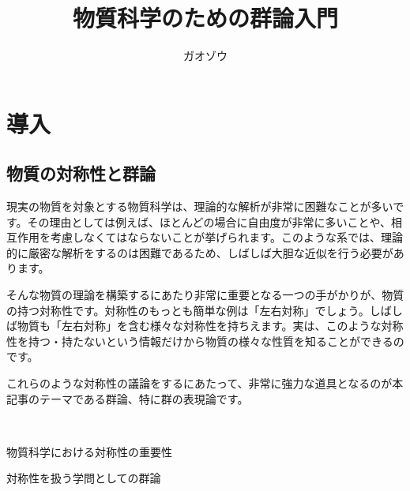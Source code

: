 \documentclass[uplatex,dvipdfmx]{jsarticle}
\title{物質科学のための群論入門}
\author{ガオゾウ}
\begin{document}
\maketitle
\section{導入}
\subsection{物質の対称性と群論}
現実の物質を対象とする物質科学は、理論的な解析が非常に困難なことが多いです。その理由としては例えば、ほとんどの場合に自由度が非常に多いことや、相互作用を考慮しなくてはならないことが挙げられます。このような系では、理論的に厳密な解析をするのは困難であるため、しばしば大胆な近似を行う必要があります。

そんな物質の理論を構築するにあたり非常に重要となる一つの手がかりが、物質の持つ対称性です。対称性のもっとも簡単な例は「左右対称」でしょう。しばしば物質も「左右対称」を含む様々な対称性を持ちえます。実は、このような対称性を持つ・持たないという情報だけから物質の様々な性質を知ることができるのです。



これらのような対称性の議論をするにあたって、非常に強力な道具となるのが本記事のテーマである群論、特に群の表現論です。


 


物質科学における対称性の重要性

対称性を扱う学問としての群論
\end{document}
